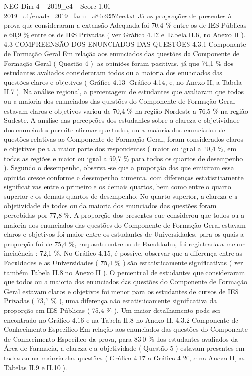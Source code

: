\begin{textsample}{NEG Dim 4 – 2019\_c4 – Score 1.00 – 2019\_c4/enade\_2019\_farm\_a84c9952ee.txt}
Já as proporções de presentes à prova que consideraram a extensão Adequada foi 70,4 \% entre os de IES Públicas e 60,9 \% entre os de IES Privadas ( ver Gráfico 4.12 e Tabela II.6, no Anexo II ). 4.3 COMPREENSÃO DOS ENUNCIADOS DAS QUESTÕES 4.3.1 Componente de Formação Geral Em relação aos enunciados das questões do Componente de Formação Geral ( Questão 4 ), as opiniões foram positivas, já que 74,1 \% dos estudantes avaliados consideraram todos ou a maioria dos enunciados das questões claros e objetivos ( Gráfico 4.13, Gráfico 4.14, e, no Anexo II, a Tabela II.7 ).
Na análise regional, a percentagem de estudantes que avaliaram que todos ou a maioria dos enunciados das questões do Componente de Formação Geral estavam claros e objetivos variou de 70,4 \% na região Nordeste a 76,5 \% na região Sudeste.
A análise das percepções dos estudantes sobre a clareza e objetividade dos enunciados permite afirmar que todos, ou a maioria dos enunciados de questões relativas ao Componente de Formação Geral, foram considerados claros e objetivos pela a maior parte dos respondentes ( maior ou igual a 70,4 \%, em todas as regiões e maior ou igual a 69,7 \% para todos os quartos de desempenho ).
Segundo o desempenho, observa -se que a proporção dos que emitiram essa opinião cresce conforme o desempenho aumenta, com diferenças estatisticamente significativas entre o primeiro e os demais quartos, bem como entre o quarto superior e os demais quartos de desempenho.
No quarto superior, a clareza e a objetividade de todos ou da maioria dos enunciados das questões foram percebidas por 77,8 \%.
A proporção dos presentes que considerou que todos ou a maioria dos enunciados das questões do Componente de Formação Geral estavam claros e objetivos foi maior entre os estudantes de Universidades, para os quais a proporção foi de 75,4 \%, enquanto entre os de Faculdades, foi registrada a menor incidência : 72,1 \%.
No Gráfico 4.15, é possível observar que a diferença entre as Faculdades e as Universidades ( 75,4 \% ) são estatisticamente significativas ( ver também Tabela II.8 no Anexo II ).
O percentual de estudantes que consideraram que todos ou a maioria dos enunciados das questões do Componente de Formação Geral estavam claros e objetivos foi menor para os estudantes de cursos de IES Privadas ( 73,7 \% ), uma diferença não estatisticamente significativa da proporção em IES Públicas ( 75,4 \% ).
Um maior detalhamento pode ser encontrado no Gráfico 4.16 e na Tabela II.8 no Anexo II. 4.3.2 Componente de Conhecimento Específico Em relação aos enunciados das questões do Componente de Conhecimento Específico da prova, para 83,0 \% dos estudantes avaliados da Área de Farmácia, a clareza e a objetividade ( Questão 5 ) estavam presentes em todas ou na maioria das questões ( Gráfico 4.17 a Gráfico 4.20, e no Anexo II, as Tabelas II.9 e II.10 ).

\end{textsample}
